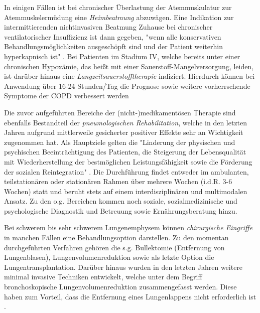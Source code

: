 In einigen Fällen ist bei chronischer Überlastung der Atemmuskulatur zur Atemmuskelermüdung eine \emph{Heimbeatmung} abzuwägen. Eine Indikation zur intermittierenden nichtinvasiven Beatmung Zuhause bei chronischer ventilatorischer Insuffizienz ist dann gegeben, "wenn alle konservativen Behandlungsmöglichkeiten ausgeschöpft sind und der Patient weiterhin hyperkapnisch ist" \autocite[e22]{vogelmeier2007}. Bei Patienten im Stadium IV, welche bereits unter einer chronischen Hypoxämie, das heißt mit einer Sauerstoff-Mangelversorgung, leiden, ist darüber hinaus eine \emph{Langzeitsauerstofftherapie} indiziert. Hierdurch können bei Anwendung über 16-24 Stunden/Tag die Prognose sowie weitere vorherrschende Symptome der COPD verbessert werden \autocite[vgl.][e22]{vogelmeier2007}

Die zuvor aufgeführten Bereiche der (nicht-)medikamentösen Therapie sind ebenfalls Bestandteil der \emph{pneumologischen Rehabilitation}, welche in den letzten Jahren aufgrund mittlerweile gesicherter positiver Effekte sehr an Wichtigkeit zugenommen hat. Als Hauptziele gelten die "Linderung der physischen und psychischen Beeinträchtigung des Patienten, die Steigerung der Lebensqualität mit Wiederherstellung der bestmöglichen Leistungsfähigkeit sowie die Förderung der sozialen Reintegration" \autocite[e21]{vogelmeier2007}. Die Durchführung findet entweder im ambulanten, teilstationären oder stationären Rahmen über mehrere Wochen (i.d.R. 3-6 Wochen) statt und beruht stets auf einem interdisziplinären und multimodalen Ansatz. Zu den o.g. Bereichen kommen noch soziale, sozialmedizinische und psychologische Diagnostik und Betreuung sowie Ernährungsberatung hinzu. 

Bei schwerem bis sehr schwerem Lungenemphysem können \emph{chirurgische Eingriffe} in manchen Fällen eine Behandlungsoption darstellen. Zu den momentan durchgeführten Verfahren gehören die s.g. Bullektomie (Entfernung von Lungenblasen), Lungenvolumenreduktion sowie als letzte Option die Lungentransplantation. Darüber hinaus wurden in den letzten Jahren weitere minimal invasive Techniken entwickelt, welche unter dem Begriff bronchoskopische Lungenvolumenreduktion zusammengefasst werden. Diese haben zum Vorteil, dass die Entfernung eines Lungenlappens nicht erforderlich ist \autocite[vgl.][e23]{vogelmeier2007}.

